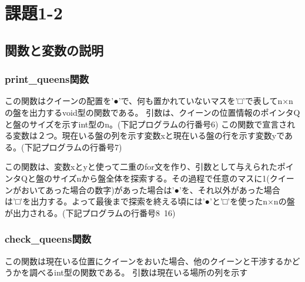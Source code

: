 \documentclass{jsarticle}
\begin{document}
\section{課題1-2}
\subsection{関数と変数の説明}
\subsubsection{print_queens関数}
この関数はクイーンの配置を'●'で、何も置かれていないマスを'□'で表してn×nの盤を出力するvoid型の関数である。
引数は、クイーンの位置情報のポインタQと盤のサイズを示すint型のn。(下記プログラムの行番号6)
この関数で宣言される変数は２つ。現在いる盤の列を示す変数xと現在いる盤の行を示す変数yである。(下記プログラムの行番号7)

この関数は、変数xとyと使って二重のfor文を作り、引数として与えられたポインタQと盤のサイズnから盤全体を探索する。その過程で任意のマスに1(クイーンがおいてあった場合の数字)があった場合は'●'を、それ以外があった場合は'□'を出力する。よって最後まで探索を終える頃には'●'と'□'を使ったn×nの盤が出力される。(下記プログラムの行番号8~16)

\subsubsection{check_queens関数}
この関数は現在いる位置にクイーンをおいた場合、他のクイーンと干渉するかどうかを調べるint型の関数である。
引数は現在いる場所の列を示す
\end{document}
